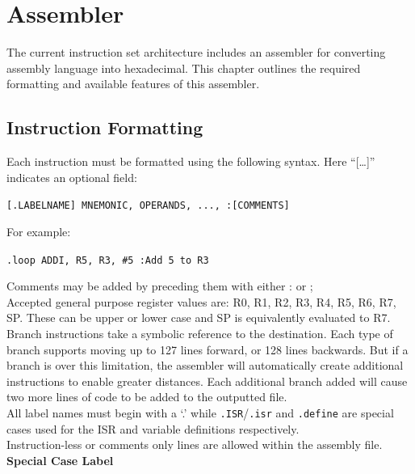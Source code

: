 
\section{Assembler}\label{sect:assembler}
The current instruction set architecture includes an assembler for converting assembly language into hexadecimal. 
This chapter outlines the required formatting and available features of this assembler. 

\subsection{Instruction Formatting}
Each instruction must be formatted using the following syntax. 
Here ``[\dots]'' indicates an optional field:

\begin{center}\texttt{[.LABELNAME] MNEMONIC, OPERANDS, ..., :[COMMENTS]}\end{center}
For example:
\begin{center}\texttt{.loop ADDI, R5, R3, \#5 :Add 5 to R3}
\end{center}

 Comments may be added by preceding them with either : or ;\\

 Accepted general purpose register values are: R0, R1, R2, R3, R4, R5, R6, R7, SP. These can be upper or lower case and SP is equivalently evaluated to R7.\\

 Branch instructions take a symbolic reference to the destination. 
Each type of branch supports moving up to 127 lines forward, or 128 lines backwards. But if a branch is over this limitation, the assembler will automatically create additional instructions to enable greater distances. Each additional branch added will cause two more lines of code to be added to the outputted file. \\

 All label names must begin with a `.' while \texttt{.ISR}/\texttt{.isr} and \texttt{.define} are special cases used for the ISR and variable definitions respectively. \\

 Instruction-less or comments only lines are allowed within the assembly file. \\
\newpage
 {\bf Special Case Label}

